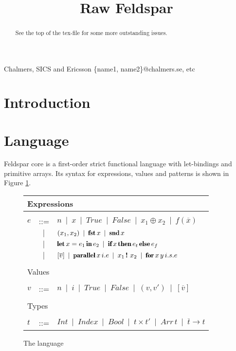\documentclass[natbib]{sigplanconf}
\newcommand{\kw}[1]{\mbox{\fontfamily{cmr}\fontseries{b}\selectfont#1}}
\newcommand{\alt}{\;\:\vert\;\:}
\newcommand{\IF}{\kw{if}\,}
\newcommand{\THEN}{\,\kw{then}\,}
\newcommand{\ELSE}{\,\kw{else}\,}
\newcommand{\LET}{\kw{let}\,}
\newcommand{\IN}{\,\kw{in}\,}
\newcommand{\PARALLEL}{\kw{parallel}\,}
\newcommand{\FOR}{\kw{for}\,}
\newcommand{\INDEX}{\,\kw{!}\,\,}
\newcommand{\TRUE}{True}
\newcommand{\FALSE}{False}
\newcommand{\ARRAY}[1]{[#1]}
\newcommand{\PAIR}[2]{(#1, #2)}
\newcommand{\FST}{\kw{fst}\,}
\newcommand{\SND}{\kw{snd}\,}
\newcommand{\TINDEX}{Index}
\newcommand{\TINT}{Int}
\newcommand{\TBOOL}{Bool}
\newcommand{\TPAIR}[2]{#1 \times #2}
\newcommand{\TARRAY}{Arr\,}
\newcommand{\TFUN}{\rightarrow}
\begin{document}




\title{Raw Feldspar}

           {Chalmers, SICS and Ericsson}
           {\{name1, name2\}@chalmers.se, etc}

\maketitle

\begin{abstract}
See the top of the tex-file for some more outstanding issues.
\end{abstract}

\section{Introduction}

\section{Language}
\label{sec:lang}

Feldspar core is a first-order strict functional language 
with let-bindings and primitive arrays. Its syntax for expressions,
values and patterns is shown in Figure \ref{fig:language}.

\begin{figure}
\begin{tabular}{lll}
\multicolumn{3}{l}{Expressions} \\ \hline \\
  $e$ &::= & $n \alt x \alt \TRUE \alt \FALSE  \alt x_1
      \oplus  x_2
      \alt  f(\overline{x})$ \\
 &  $\alt$ & $(x_1, x_2) \alt \FST x \alt \SND x$ \\ 
 &  $\alt$ & $\LET x = e_1 \IN e_2 \alt \IF x \THEN e_t \ELSE e_f$ \\ 
 &  $\alt$ & $\ARRAY{\overline{v}} \alt \PARALLEL x\, i.e \alt x_1 \INDEX x_2 \alt
              \FOR x\, y\, i.s.e$\\
\\
\multicolumn{3}{l}{Values} \\ \hline \\
  $v$ &::= & $n  \alt i \alt \TRUE \alt \FALSE \alt \PAIR{v}{v'} \alt \ARRAY{\overline{v}}$ \\
\\
\multicolumn{3}{l}{Types} \\ \hline \\
  $t$ &::= & $\TINT \alt \TINDEX \alt \TBOOL \alt \TPAIR{t}{t'}  \alt \TARRAY t \alt \overline{t} \TFUN t$ \\
\end{tabular}  
\caption{The language}
\label{fig:language}
\end{figure}
\end{document}
